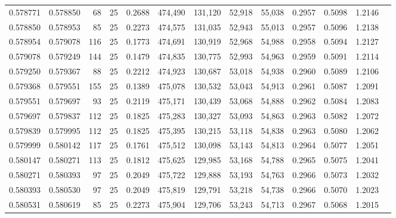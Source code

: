 \begin{tabular}{rrrrrrrrrrrrr}
0.578771 & 0.578850 &    68 &  25 &                                     0.2688 & 474,490 & 131,120 &  52,918 &  55,038 & 0.2957 & 0.5098 & 1.2146 \\
0.578850 & 0.578953 &    85 &  25 &                                     0.2273 & 474,575 & 131,035 &  52,943 &  55,013 & 0.2957 & 0.5096 & 1.2138 \\
0.578954 & 0.579078 &   116 &  25 &                                     0.1773 & 474,691 & 130,919 &  52,968 &  54,988 & 0.2958 & 0.5094 & 1.2127 \\
0.579078 & 0.579249 &   144 &  25 &                                     0.1479 & 474,835 & 130,775 &  52,993 &  54,963 & 0.2959 & 0.5091 & 1.2114 \\
0.579250 & 0.579367 &    88 &  25 &                                     0.2212 & 474,923 & 130,687 &  53,018 &  54,938 & 0.2960 & 0.5089 & 1.2106 \\
0.579368 & 0.579551 &   155 &  25 &                                     0.1389 & 475,078 & 130,532 &  53,043 &  54,913 & 0.2961 & 0.5087 & 1.2091 \\
0.579551 & 0.579697 &    93 &  25 &                                     0.2119 & 475,171 & 130,439 &  53,068 &  54,888 & 0.2962 & 0.5084 & 1.2083 \\
0.579697 & 0.579837 &   112 &  25 &                                     0.1825 & 475,283 & 130,327 &  53,093 &  54,863 & 0.2963 & 0.5082 & 1.2072 \\
0.579839 & 0.579995 &   112 &  25 &                                     0.1825 & 475,395 & 130,215 &  53,118 &  54,838 & 0.2963 & 0.5080 & 1.2062 \\
0.579999 & 0.580142 &   117 &  25 &                                     0.1761 & 475,512 & 130,098 &  53,143 &  54,813 & 0.2964 & 0.5077 & 1.2051 \\
0.580147 & 0.580271 &   113 &  25 &                                     0.1812 & 475,625 & 129,985 &  53,168 &  54,788 & 0.2965 & 0.5075 & 1.2041 \\
0.580271 & 0.580393 &    97 &  25 &                                     0.2049 & 475,722 & 129,888 &  53,193 &  54,763 & 0.2966 & 0.5073 & 1.2032 \\
0.580393 & 0.580530 &    97 &  25 &                                     0.2049 & 475,819 & 129,791 &  53,218 &  54,738 & 0.2966 & 0.5070 & 1.2023 \\
0.580531 & 0.580619 &    85 &  25 &                                     0.2273 & 475,904 & 129,706 &  53,243 &  54,713 & 0.2967 & 0.5068 & 1.2015 \\

\end{tabular}
